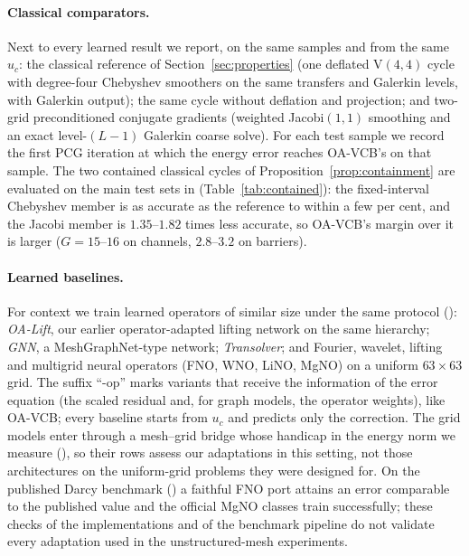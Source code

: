 \paragraph{Classical comparators.} Next to every learned result we report, on the same samples and from the same $u_c$: the
classical reference of Section~\ref{sec:properties} (one deflated V$(4,4)$ cycle with degree-four Chebyshev smoothers on the
same transfers and Galerkin levels, with Galerkin output); the same cycle without deflation and projection; and two-grid
preconditioned conjugate gradients (weighted Jacobi$(1,1)$ smoothing and an exact level-$(L-1)$ Galerkin coarse solve). For
each test sample we record the first PCG iteration at which the energy error reaches OA-VCB's on that sample. The two
contained classical cycles of Proposition~\ref{prop:containment} are evaluated on the main test sets in 
(Table~\ref{tab:contained}): the fixed-interval Chebyshev member is as accurate as the reference to within a few per cent,
and the Jacobi member is $1.35$--$1.82$ times less accurate, so OA-VCB's margin over it is larger ($G = 15$--$16$ on channels,
$2.8$--$3.2$ on barriers).

\paragraph{Learned baselines.}\label{sec:baselines} For context we train learned operators of similar size under the same
protocol (): \emph{OA-Lift}, our earlier operator-adapted lifting network on the same hierarchy;
\emph{GNN}, a MeshGraphNet-type network; \emph{Transolver}; and Fourier, wavelet, lifting and multigrid neural operators
(FNO, WNO, LiNO, MgNO) on a uniform $63\times63$ grid. The suffix ``-op'' marks variants that receive the information of the
error equation (the scaled residual and, for graph models, the operator weights), like OA-VCB; every baseline starts from
$u_c$ and predicts only the correction. The grid models enter through a mesh--grid bridge whose handicap in the energy norm we
measure (), so their rows assess our adaptations in this setting, not those architectures on the
uniform-grid problems they were designed for. On the published Darcy benchmark () a faithful FNO port
attains an error comparable to the published value and the official MgNO classes train successfully; these checks of the
implementations and of the benchmark pipeline do not validate every adaptation used in the unstructured-mesh experiments.

